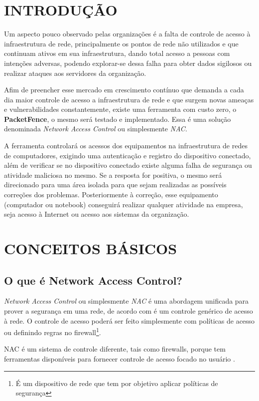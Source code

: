 \documentclass[12pt, brazil, ruledheader, pnumromarab,normaltoc]{abnt}
\begin{document}
\chapter{INTRODUÇÃO}
Um aspecto pouco observado pelas organizações é a falta de controle de acesso à infraestrutura de rede, principalmente os pontos de rede não utilizados e que continuam ativos em sua infraestrutura, dando total acesso a pessoas com intenções adversas, podendo explorar-se dessa falha para obter dados sigilosos ou realizar ataques aos servidores da organização.
\par
Afim de preencher esse mercado em crescimento contínuo que demanda a cada dia maior controle de acesso a infraestrutura de rede e que surgem novas ameaças e vulnerabilidades constantemente, existe uma ferramenta com custo zero, o \textbf{PacketFence}, o mesmo será testado e implementado. Essa é uma solução denominada \textit{Network Access Control}  ou simplesmente \emph{NAC}.
\par
A ferramenta controlará os acessos dos equipamentos na infraestrutura de redes de computadores, exigindo uma autenticação e registro do dispositivo conectado, além de verificar se no dispositivo conectado existe alguma falha de segurança ou atividade maliciosa no mesmo. Se a resposta for positiva, o mesmo será direcionado para uma área isolada para que sejam realizadas as possíveis correções dos problemas. Posteriormente à correção, esse equipamento (computador ou notebook) conseguirá realizar qualquer atividade na empresa, seja acesso à Internet ou acesso aos sistemas da organização.

\chapter{CONCEITOS BÁSICOS}
\section{O que é Network Access Control?}\label{sec:nac}
\emph{Network Access Control} ou simplesmente \emph{NAC} é uma abordagem unificada para prover a segurança em uma rede, de acordo com \cite{interop-nac} é um controle genérico de acesso à rede. O controle de acesso poderá ser feito simplesmente com políticas de acesso ou definindo regras no firewall\footnote{É um dispositivo de rede que tem por objetivo aplicar políticas de segurança}.
\par
NAC é um sistema de controle diferente, tais como firewalls, porque tem ferramentas disponíveis para fornecer controle de acesso focado no usuário \cite{interop-nac}.
\end{document}

